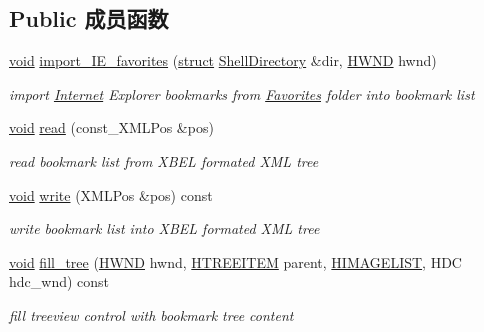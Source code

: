 \subsection*{Public 成员函数}
\begin{DoxyCompactItemize}
\item 
\hyperlink{interfacevoid}{void} \hyperlink{struct_bookmark_list_a473d8d4b6ddf51a2b2c01fa5de6045ea}{import\+\_\+\+I\+E\+\_\+favorites} (\hyperlink{interfacestruct}{struct} \hyperlink{struct_shell_directory}{Shell\+Directory} \&dir, \hyperlink{interfacevoid}{H\+W\+ND} hwnd)
\begin{DoxyCompactList}\small\item\em import \hyperlink{class_internet}{Internet} Explorer bookmarks from \hyperlink{struct_favorites}{Favorites} folder into bookmark list \end{DoxyCompactList}\item 
\mbox{\label{struct_bookmark_list_aba126d11709d4025bf8510eee78fe4fe}} 
\hyperlink{interfacevoid}{void} \hyperlink{struct_bookmark_list_aba126d11709d4025bf8510eee78fe4fe}{read} (const\+\_\+\+X\+M\+L\+Pos \&pos)
\begin{DoxyCompactList}\small\item\em read bookmark list from X\+B\+EL formated X\+ML tree \end{DoxyCompactList}\item 
\mbox{\label{struct_bookmark_list_a1306c0f9b2db999374058c91f00d96e9}} 
\hyperlink{interfacevoid}{void} \hyperlink{struct_bookmark_list_a1306c0f9b2db999374058c91f00d96e9}{write} (X\+M\+L\+Pos \&pos) const
\begin{DoxyCompactList}\small\item\em write bookmark list into X\+B\+EL formated X\+ML tree \end{DoxyCompactList}\item 
\mbox{\label{struct_bookmark_list_a5b4fa3a36c556b4b96ddc0013fb52144}} 
\hyperlink{interfacevoid}{void} \hyperlink{struct_bookmark_list_a5b4fa3a36c556b4b96ddc0013fb52144}{fill\+\_\+tree} (\hyperlink{interfacevoid}{H\+W\+ND} hwnd, \hyperlink{struct___t_r_e_e_i_t_e_m}{H\+T\+R\+E\+E\+I\+T\+EM} parent, \hyperlink{struct___i_m_a_g_e_l_i_s_t}{H\+I\+M\+A\+G\+E\+L\+I\+ST}, H\+DC hdc\+\_\+wnd) const
\begin{DoxyCompactList}\small\item\em fill treeview control with bookmark tree content \end{DoxyCompactList}\end{DoxyCompactItemize}

